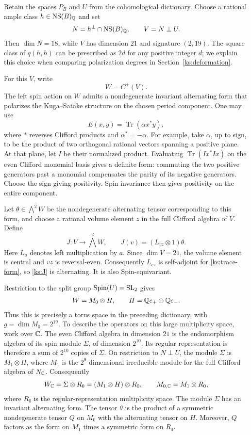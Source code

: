 Retain the spaces $P_B$ and $U$ from the cohomological dictionary.
Choose a rational ample class $h\in\operatorname{NS}(B)_{\mathbb Q}$ and set
\[
 N=h^\perp\cap\operatorname{NS}(B)_{\mathbb Q},\qquad V=N\perp U.
\]
Then $\dim N=18$, while $V$ has dimension $21$ and signature
$(2,19)$.  The square class of $q(h,h)$ can be prescribed as
$2d$ for any positive integer $d$; we explain this choice when
comparing polarization degrees in Section~\ref{ks:deformation}.

For this $V$, write
\[
 W=C^+(V).
\]
The left spin action on $W$ admits a nondegenerate invariant
alternating form that polarizes the Kuga--Satake structure on
the chosen period component.  One may use
\begin{equation}
 \label{ks:trace-form}
 E(x,y)=\operatorname{Tr}(\alpha x^*y),
\end{equation}
where $*$ reverses Clifford products and $\alpha^*=-\alpha$.
For example, take $\alpha$, up to sign, to be the product of
two orthogonal rational vectors spanning a positive plane.
At that plane, let $I$ be their normalized product.  Evaluating
$\operatorname{Tr}(I x^* I x)$ on the even Clifford monomial
basis gives a definite form: commuting the two positive
generators past a monomial compensates the parity of its
negative generators.  Choose the sign giving positivity.
Spin invariance then gives positivity on the entire component.

Let $\theta\in\bigwedge^2W$ be the nondegenerate alternating
tensor corresponding to this form, and choose a rational volume
element $z$ in the full Clifford algebra of $V$.  Define
\begin{equation}
 \label{ks:J}
 J:V\longrightarrow\bigwedge^2W,
 \qquad J(v)=(L_{vz}\otimes1)\theta.
\end{equation}
Here $L_a$ denotes left multiplication by $a$.  Since $\dim V=21$,
the volume element is central and $vz$ is reversal-even.
Consequently $L_{vz}$ is self-adjoint for \eqref{ks:trace-form},
so \eqref{ks:J} is alternating.  It is also Spin-equivariant.

Restriction to the split group $\operatorname{Spin}(U)=\mathrm{SL}_2$ gives
\[
 W=M_0\otimes H,
 \qquad H=\mathbb Q e_+\oplus\mathbb Q e_-.
\]
Thus this is precisely a torus space in the preceding dictionary,
with $g=\dim M_0=2^{19}$.  To describe the operators on this large
multiplicity space, work over $\mathbb C$.  The even Clifford algebra in
dimension $21$ is the endomorphism algebra of its spin module
$\Sigma$, of dimension $2^{10}$.  Its regular representation is
therefore a sum of $2^{10}$ copies of $\Sigma$.  On restriction to
$N\perp U$, the module $\Sigma$ is $M_1\otimes H$, where $M_1$
is the $2^9$-dimensional irreducible module for the full Clifford
algebra of $N_{\mathbb C}$.  Consequently
\begin{equation}
 \label{ks:multiplicity}
 W_{\mathbb C}=\Sigma\otimes R_0=(M_1\otimes H)\otimes R_0,
 \qquad M_{0,\mathbb C}=M_1\otimes R_0,
\end{equation}
where $R_0$ is the regular-representation multiplicity space.
The module $\Sigma$ has an invariant alternating form.  The tensor $\theta$ is the
product of a symmetric nondegenerate tensor $Q$ on $M_0$ with
the alternating tensor on $H$.  Moreover, $Q$ factors as the
form on $M_1$ times a symmetric form on $R_0$.

